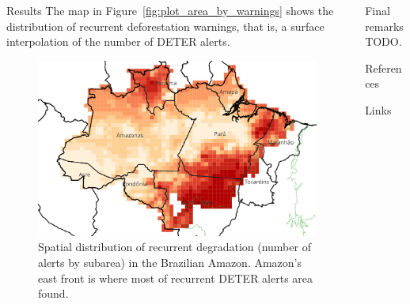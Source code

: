 \documentclass[20pt]{beamer}
\begin{document}
\begin{frame}[fragile,t]
\begin{columns}[t]
\begin{column}{0.33\linewidth}
\begin{block}{Results\vphantom{g}}
The map in Figure~\ref{fig:plot_area_by_warnings} shows the distribution of recurrent deforestation warnings, that is, a surface interpolation of the number of DETER alerts.

\begin{figure}[h] 
    \begin{center}
        \includegraphics[width=\linewidth]{./figures/nwarnings_idw_map.png}
        \caption{Spatial distribution of recurrent degradation (number of
        alerts by subarea) in the Brazilian Amazon. Amazon's east front is
        where most of recurrent DETER alerts area found.}
    \label{fig:nwarnings_idw_map}
    \end{center}
\end{figure}


    \end{block}
\vspace{1cm}
\end{column}




\begin{column}{0.33\linewidth}
\vspace{1cm}
    \begin{block}{Final remarks\vphantom{g}}
        TODO.
    \end{block}

\vspace{1cm}
    \begin{block}{References\vphantom{g}}


    \end{block}



\vspace{1.0cm}
    \begin{block}{Links}


\end{block}
\end{column}
\end{columns}
\end{frame}
\end{document}
